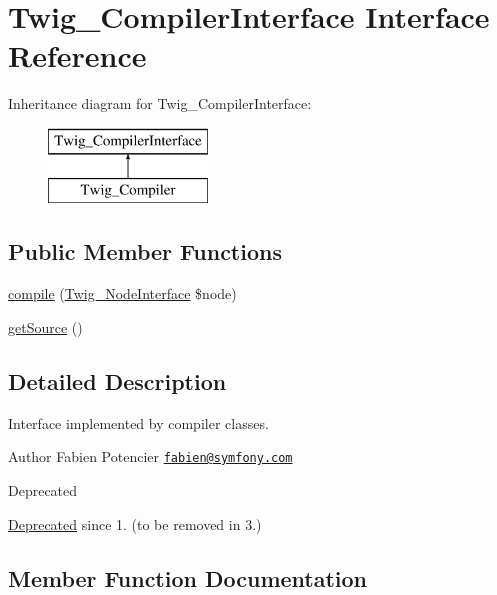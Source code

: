 \hypertarget{interface_twig___compiler_interface}{}\section{Twig\+\_\+\+Compiler\+Interface Interface Reference}
\label{interface_twig___compiler_interface}
Inheritance diagram for Twig\+\_\+\+Compiler\+Interface\+:\begin{figure}[H]
\begin{center}
\leavevmode
\includegraphics[height=2.000000cm]{interface_twig___compiler_interface}
\end{center}
\end{figure}
\subsection*{Public Member Functions}
\begin{DoxyCompactItemize}
\item 
\hyperlink{interface_twig___compiler_interface_a3f2ebfe4306bcd152c544085112319b5}{compile} (\hyperlink{interface_twig___node_interface}{Twig\+\_\+\+Node\+Interface} \$node)
\item 
\hyperlink{interface_twig___compiler_interface_a42fdd8313c99d9c5f80219c1e192b93a}{get\+Source} ()
\end{DoxyCompactItemize}


\subsection{Detailed Description}
Interface implemented by compiler classes.

\begin{DoxyAuthor}{Author}
Fabien Potencier \href{mailto:fabien@symfony.com}{\tt fabien@symfony.\+com}
\end{DoxyAuthor}
\begin{DoxyRefDesc}{Deprecated}
\item[\hyperlink{deprecated__deprecated000001}{Deprecated}]since 1. (to be removed in 3.) \end{DoxyRefDesc}


\subsection{Member Function Documentation}
\hypertarget{interface_twig___compiler_interface_a3f2ebfe4306bcd152c544085112319b5}{}
